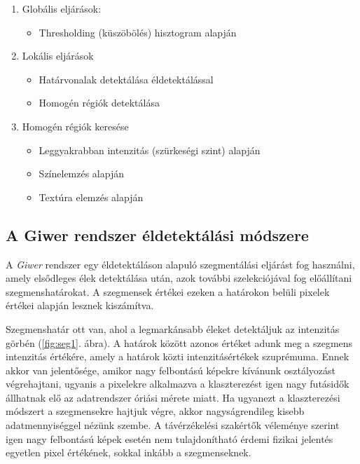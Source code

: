 \documentclass[a4paper,12pt]{article}
\begin{document}
\begin{enumerate}
	
	\item Globális eljárások: 
	
	\begin{itemize}
    \item	Thresholding (küszöbölés) hisztogram alapján
	\end{itemize}

	\item Lokális eljárások
		\begin{itemize}
		\item	Határvonalak detektálása éldetektálással
		\item Homogén régiók detektálása
		\end{itemize}
	\item Homogén régiók keresése
		\begin{itemize}
	    \item	Leggyakrabban intenzitás (szürkeségi szint) alapján
	    \item Színelemzés alapján
	    \item Textúra elemzés alapján
		\end{itemize}

\end{enumerate}

\subsection{A Giwer rendszer éldetektálási módszere}

 A \textit{Giwer} rendszer egy éldetektáláson alapuló szegmentálási eljárást fog használni, amely elsődleges élek detektálása után, azok további szelekciójával fog előállítani szegmenshatárokat. A szegmensek értékei ezeken a határokon belüli pixelek értékei alapján lesznek kiszámítva.
 
 Szegmenshatár ott van, ahol a legmarkánsabb éleket detektáljuk az intenzitás görbén (\ref{fig:seg1}. ábra). A határok között azonos értéket adunk meg a szegmens intenzitás értékére, amely a határok közti intenzitásértékek szuprémuma. Ennek akkor van jelentősége, amikor nagy felbontású képekre kívánunk osztályozást végrehajtani, ugyanis a pixelekre alkalmazva a klaszterezést igen nagy futásidők állhatnak elő az adatrendszer óriási mérete miatt. Ha ugyanezt a klaszterezési módszert a szegmensekre hajtjuk végre, akkor nagyságrendileg kisebb adatmennyiséggel nézünk szembe. A távérzékelési szakértők véleménye szerint igen nagy felbontású képek esetén nem tulajdonítható érdemi fizikai jelentés egyetlen pixel értékének, sokkal inkább a szegmenseknek.
 
\end{document}
